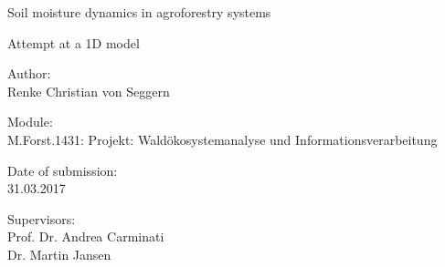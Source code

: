 \begin{titlepage}

\begin{center}

\vspace*{5cm}

{\LARGE Soil moisture dynamics in agroforestry systems \\}
{\Large  Attempt at a 1D model \par}

\vspace{2cm}

{\large Author: \\ Renke Christian von Seggern \par}

\vspace{2cm}

{\normalsize Module: \\ M.Forst.1431: Projekt: Waldökosystemanalyse und Informationsverarbeitung}

\vspace{0.5cm}

{\normalsize Date of submission: \\ 31.03.2017 \par}

\vspace{0.5cm}

{\normalsize Supervisors: \\ Prof. Dr. Andrea Carminati \\ Dr. Martin Jansen \par}

\end{center}

\end{titlepage}


